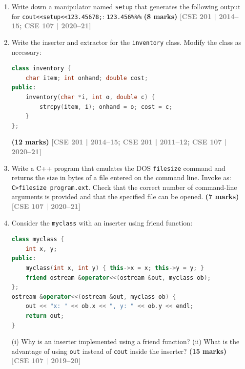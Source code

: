 \documentclass[12pt,a3paper]{article}
\newcommand{\yr}[1]{\hfill\textcolor{gray}{\small\textbf{[#1]}}}
\newcommand{\mk}[1]{\textcolor{orange!70!black}{\small\textbf{(#1 marks)}}}
\begin{document}
\begin{enumerate}
\item Write down a manipulator named \texttt{setup} that generates the following output for \texttt{cout<<setup<<123.45678;}: \quad \texttt{123.456\%\%\%} \mk{8}
\yr{CSE 201 | 2014--15; CSE 107 | 2020--21}





\item Write the inserter and extractor for the \texttt{inventory} class. Modify the class as necessary:
\begin{lstlisting}[language=C++]
class inventory {
    char item; int onhand; double cost;
public:
    inventory(char *i, int o, double c) {
        strcpy(item, i); onhand = o; cost = c;
    }
};
\end{lstlisting}
\mk{12}
\yr{CSE 201 | 2014--15; CSE 201 | 2011--12; CSE 107 | 2020--21}





\item Write a C++ program that emulates the DOS \texttt{filesize} command and returns the size in bytes of a file entered on the command line. Invoke as: \texttt{C>filesize program.ext}. Check that the correct number of command-line arguments is provided and that the specified file can be opened. \mk{7}
\yr{CSE 107 | 2020--21}





\item Consider the \texttt{myclass} with an inserter using friend function:
\begin{lstlisting}[language=C++]
class myclass {
    int x, y;
public:
    myclass(int x, int y) { this->x = x; this->y = y; }
    friend ostream &operator<<(ostream &out, myclass ob);
};
ostream &operator<<(ostream &out, myclass ob) {
    out << "x: " << ob.x << ", y: " << ob.y << endl;
    return out;
}
\end{lstlisting}
(i) Why is an inserter implemented using a friend function? (ii) What is the advantage of using \texttt{out} instead of \texttt{cout} inside the inserter? \mk{15}
\yr{CSE 107 | 2019--20}







\end{enumerate}
\end{document}
